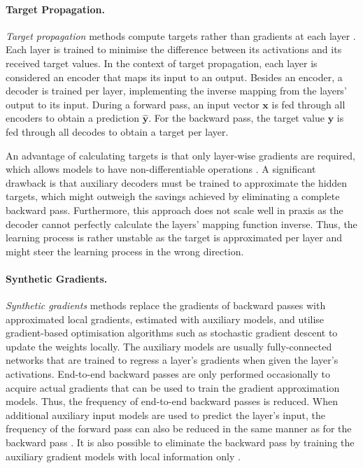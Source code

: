 \paragraph{Target Propagation.} \emph{Target propagation} methods compute targets rather than gradients at each layer .
Each layer is trained to minimise the difference between its activations and its received target values.
In the context of target propagation, each layer is considered an encoder that maps its input to an output. Besides an encoder, a decoder is trained per layer, implementing the inverse mapping from the layers' output to its input.
During a forward pass, an input vector $\boldsymbol{x}$ is fed through all encoders to obtain a prediction $\boldsymbol{\hat{y}}$. For the backward pass, the target value $\boldsymbol{y}$ is fed through all decodes to obtain a target per layer.


An advantage of calculating targets is that only layer-wise gradients are required, which allows models to have non-differentiable operations \cite{appice_difference_2015}.
A significant drawback is that auxiliary decoders must be trained to approximate the hidden targets, which might outweigh the savings achieved by eliminating a complete backward pass.
Furthermore, this approach does not scale well in praxis as the decoder cannot perfectly calculate the layers' mapping function inverse. 
Thus, the learning process is rather unstable as the target is approximated per layer and might steer the learning process in the wrong direction.


\paragraph{Synthetic Gradients.} \emph{Synthetic gradients} methods  replace the gradients of backward passes with approximated local gradients, estimated with auxiliary models, and utilise gradient-based optimisation algorithms such as stochastic gradient descent to update the weights locally.
The auxiliary models are usually fully-connected networks that are trained to regress a layer's gradients when given the layer's activations.
End-to-end backward passes are only performed occasionally to acquire actual gradients that can be used to train the gradient approximation models.
Thus, the frequency of end-to-end backward passes is reduced.
When additional auxiliary input models are used to predict the layer's input, the frequency of the forward pass can also be reduced in the same manner as for the backward pass \cite{jaderberg_decoupled_2017}.
It is also possible to eliminate the backward pass by training the auxiliary gradient models with local information only .

